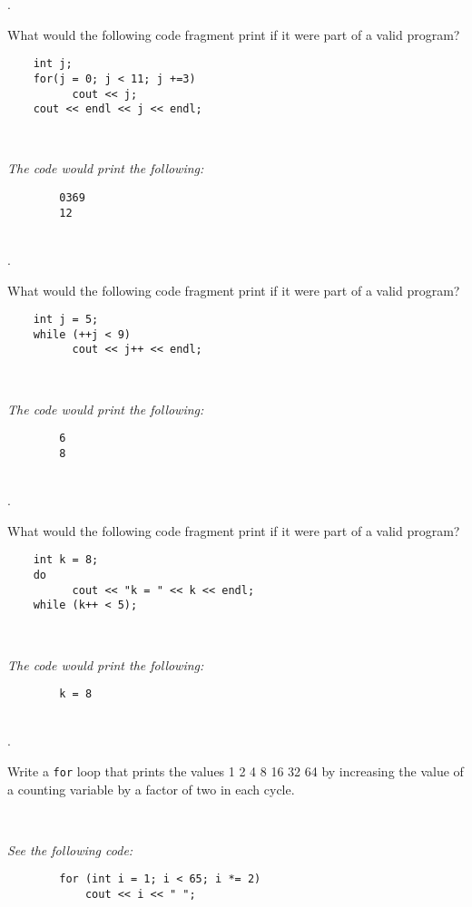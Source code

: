 \documentclass{amsart}
\begin{document}
. 
\begin{minipage}[t]{11.5 cm}
	What would the following code fragment print if it were part of a valid program?
\begin{verbatim}
	int j;
	for(j = 0; j < 11; j +=3)
	      cout << j;
	cout << endl << j << endl;
\end{verbatim}
\end{minipage} \\[1ex]
\phantom{3. } 
\begin{minipage}[t]{11.5 cm}
	{\slshape The code would print the following:}
	\begin{verbatim}
		0369
		12
	\end{verbatim} 
\end{minipage} 
\\[.2cm]

. 
\begin{minipage}[t]{11.5 cm}
	What would the following code fragment print if it were part of a valid program?
\begin{verbatim}
	int j = 5;
	while (++j < 9)
	      cout << j++ << endl;
\end{verbatim}
\end{minipage} \\[1ex]
\phantom{2. } 
\begin{minipage}[t]{11.5 cm}
	{\slshape The code would print the following:}
	\begin{verbatim}
		6
		8
	\end{verbatim} 
\end{minipage} 
\\[.2cm]

. 
\begin{minipage}[t]{11.5 cm}
	What would the following code fragment print if it were part of a valid program?
\begin{verbatim}
	int k = 8;
	do
	      cout << "k = " << k << endl;
	while (k++ < 5);
\end{verbatim}
\end{minipage} \\[1ex]
\phantom{3. } 
\begin{minipage}[t]{11.5 cm}
	{\slshape The code would print the following:}
	\begin{verbatim}
		k = 8
	\end{verbatim} 
\end{minipage} 
\\[.2cm]

. 
\begin{minipage}[t]{11.5 cm}
	Write a \texttt{for} loop that prints the values 1 2 4 8 16 32 64 by increasing the value of a counting variable by a factor of two in each cycle. 
\end{minipage} \\[1ex]
\phantom{3. } 
\begin{minipage}[t]{11.5 cm}
	{\slshape See the following code:}
	\begin{verbatim}
		for (int i = 1; i < 65; i *= 2)
		    cout << i << " ";
	\end{verbatim}
\end{minipage} 
\\[.2cm]
\end{document}
